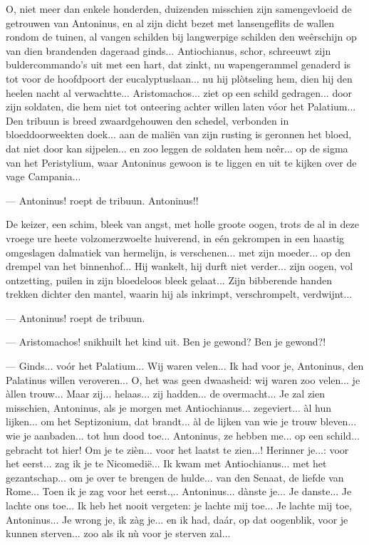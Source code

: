 \documentclass[a4paper, 12pt, oneside, dutch]{article}
\begin{document}
O, niet meer dan enkele honderden, duizenden misschien zijn samengevloeid de getrouwen van Antoninus, en al zijn dicht bezet met lansengeflits de wallen rondom de tuinen, al vangen schilden bij langwerpige schilden den weêrschijn op van dien brandenden dageraad ginds... Antiochianus, schor, schreeuwt zijn buldercommando's uit met een hart, dat zinkt, nu wapengerammel genaderd is tot voor de hoofdpoort der eucalyptuslaan... nu hij plòtseling hem, dien hij den heelen nacht al verwachtte... Aristomachos... ziet op een schild gedragen... door zijn soldaten, die hem niet tot onteering achter willen laten vóor het Palatium... Den tribuun is breed zwaardgehouwen den schedel, verbonden in bloeddoorweekten doek... aan de maliën van zijn rusting is geronnen het bloed, dat niet door kan sijpelen... en zoo leggen de soldaten hem neêr... op de sigma van het Peristylium, waar Antoninus gewoon is te liggen en uit te kijken over de vage Campania...

--- Antoninus! roept de tribuun. Antoninus!!

De keizer, een schim, bleek van angst, met holle groote oogen, trots de al in deze vroege ure heete volzomerzwoelte huiverend, in eén gekrompen in een haastig omgeslagen dalmatiek van hermelijn, is verschenen... met zijn moeder... op den drempel van het binnenhof... Hij wankelt, hij durft niet verder... zijn oogen, vol ontzetting, puilen in zijn bloedeloos bleek gelaat... Zijn bibberende handen trekken dichter den mantel, waarin hij als inkrimpt, verschrompelt, verdwijnt...

--- Antoninus! roept de tribuun.

--- Aristomachos! snikhuilt het kind uit. Ben je gewond? Ben je gewond?!

--- Ginds... voór het Palatium... Wij waren velen... Ik had voor je, Antoninus, den Palatinus willen veroveren... O, het was geen dwaasheid: wij waren zoo velen... je àllen trouw... Maar zij... helaas... zij hadden... de overmacht... Je zal zien misschien, Antoninus, als je morgen met Antiochianus... zegeviert... àl hun lijken... om het Septizonium, dat brandt... àl de lijken van wie je trouw bleven... wie je aanbaden... tot hun dood toe... Antoninus, ze hebben me... op een schild... gebracht tot hier! Om je te zièn... voor het laatst te zien...! Herinner je...: voor het eerst... zag ik je te Nicomedië... Ik kwam met Antiochianus... met het gezantschap... om je over te brengen de hulde... van den Senaat, de liefde van Rome... Toen ik je zag voor het eerst.,.. Antoninus... dànste je... Je danste... Je lachte ons toe... Ik heb het nooit vergeten: je lachte mij toe... Je lachte mij toe, Antoninus... Je wrong je, ik zàg je... en ik had, daár, op dat oogenblik, voor je kunnen sterven... zoo als ik nù voor je sterven zal...
\end{document}
